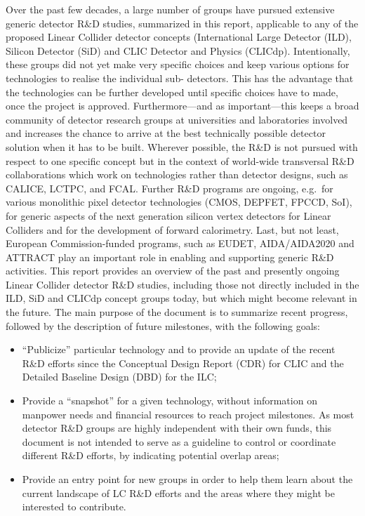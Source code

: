 \documentclass[10pt,final]{report}
\begin{document}
Over the past few decades, a large number of groups have pursued extensive generic
detector R\&D studies, summarized in this report, applicable to any of the proposed Linear
Collider detector concepts (International Large Detector (ILD), Silicon Detector (SiD) and
CLIC Detector and Physics (CLICdp). Intentionally, these groups did not yet make very
specific choices and keep various options for technologies to realise the individual sub-
detectors. This has the advantage that the technologies can be further developed until
specific choices have to made, once the project is approved. Furthermore---and as important---this
keeps a broad community of detector research groups at universities and laboratories
involved and increases the chance to arrive at the best technically possible detector solution
when it has to be built. Wherever possible, the R\&D is not pursued with respect to one
specific concept but in the context of world-wide transversal R\&D collaborations which work
on technologies rather than detector designs, such as CALICE, LCTPC, and FCAL. Further
R\&D programs are ongoing, e.g.\ for various monolithic pixel detector technologies
(CMOS, DEPFET, FPCCD, SoI), for generic aspects of the next generation silicon vertex
detectors for Linear Colliders and for the development of forward calorimetry. Last, but not
least, European Commission-funded programs, such as EUDET, AIDA/AIDA2020 and
ATTRACT play an important role in enabling and supporting generic R\&D activities.
This report provides an overview of the past and presently ongoing Linear Collider
detector R\&D studies, including those not directly included in the ILD, SiD and CLICdp
concept groups today, but which might become relevant in the future. The main purpose of
the document is to summarize recent progress, followed by the description of future
milestones, with the following goals:
\begin{itemize}
	\item ``Publicize'' particular technology and to provide an update of the recent R\&D efforts
since the Conceptual Design Report (CDR) for CLIC and the Detailed Baseline
Design (DBD) for the ILC;
	\item Provide a ``snapshot'' for a given technology, without information on manpower needs
and financial resources to reach project milestones. As most detector R\&D groups
are highly independent with their own funds, this document is not intended to serve
as a guideline to control or coordinate different R\&D efforts, by indicating potential
overlap areas;
	\item Provide an entry point for new groups in order to help them learn about the current
landscape of LC R\&D efforts and the areas where they might be interested to
contribute.
\end{itemize}
\end{document}
